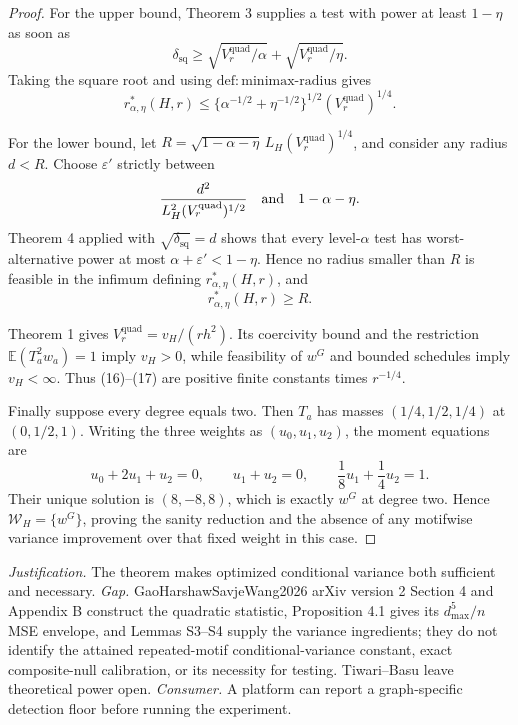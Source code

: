 \documentclass{article}
\begin{document}
\begin{proof}
For the upper bound, Theorem 3 supplies a test with power at least \(1-\eta\) as soon as
\[
\delta_{\mathrm{sq}}
\ge \sqrt{V_r^{\mathrm{quad}}/\alpha}+\sqrt{V_r^{\mathrm{quad}}/\eta}.
\]
Taking the square root and using \(\mathrm{def:minimax\text{-}radius}\) gives
\[
r^*_{\alpha,\eta}(H,r)
\le\{\alpha^{-1/2}+\eta^{-1/2}\}^{1/2}(V_r^{\mathrm{quad}})^{1/4}. \tag{16}
\]

For the lower bound, let \(R=\sqrt{1-\alpha-\eta}\,L_H(V_r^{\mathrm{quad}})^{1/4}\), and consider any radius \(d<R\).  Choose \(\varepsilon'\) strictly between
\[
\frac{d^2}{L_H^2(V_r^{\mathrm{quad}})^{1/2}}
\quad\hbox{and}\quad 1-\alpha-\eta.
\]
Theorem 4 applied with \(\sqrt{\delta_{\mathrm{sq}}}=d\) shows that every level-\(\alpha\) test has worst-alternative power at most \(\alpha+\varepsilon'<1-\eta\).  Hence no radius smaller than \(R\) is feasible in the infimum defining \(r^*_{\alpha,\eta}(H,r)\), and
\[
r^*_{\alpha,\eta}(H,r)\ge R. \tag{17}
\]

Theorem 1 gives \(V_r^{\mathrm{quad}}=v_H/(rh^2)\).  Its coercivity bound and the restriction \(\mathbb E(T_a^2w_a)=1\) imply \(v_H>0\), while feasibility of \(w^G\) and bounded schedules imply \(v_H<\infty\).  Thus (16)--(17) are positive finite constants times \(r^{-1/4}\).

Finally suppose every degree equals two.  Then \(T_a\) has masses \((1/4,1/2,1/4)\) at \((0,1/2,1)\).  Writing the three weights as \((u_0,u_1,u_2)\), the moment equations are
\[
u_0+2u_1+u_2=0,
\qquad u_1+u_2=0,
\qquad \frac18u_1+\frac14u_2=1.
\]
Their unique solution is \((8,-8,8)\), which is exactly \(w^G\) at degree two.  Hence \(\mathcal W_H=\{w^G\}\), proving the sanity reduction and the absence of any motifwise variance improvement over that fixed weight in this case.
\end{proof}
\par\smallskip\noindent \textit{Justification.} The theorem makes optimized conditional variance both sufficient and necessary. \textit{Gap.} GaoHarshawSavjeWang2026 arXiv version 2 Section 4 and Appendix B construct the quadratic statistic, Proposition 4.1 gives its \(d_{\max}^5/n\) MSE envelope, and Lemmas S3--S4 supply the variance ingredients; they do not identify the attained repeated-motif conditional-variance constant, exact composite-null calibration, or its necessity for testing. Tiwari--Basu leave theoretical power open. \textit{Consumer.} A platform can report a graph-specific detection floor before running the experiment.
\end{document}
